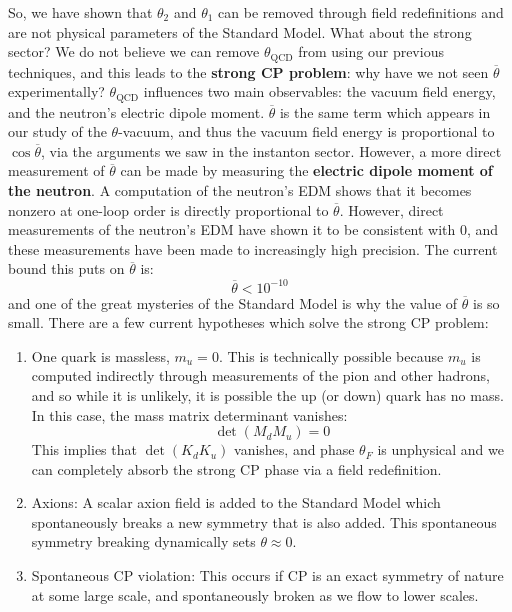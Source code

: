 \documentclass[11pt, oneside]{article}   	%
\theoremstyle{definition}
\begin{document}
So, we have shown that $\theta_2$ and $\theta_1$ can be removed through field redefinitions and are not physical parameters of the Standard Model. 
What about the strong sector? We do not believe we can remove $\theta_\mathrm{QCD}$ from using our previous techniques, and this leads 
to the \textbf{strong CP problem}: why have we not seen $\overline\theta$ experimentally? $\theta_\mathrm{QCD}$ influences two main 
observables: the vacuum field energy, and the neutron's electric dipole moment. $\overline\theta$ is the same term which appears in our study of the 
$\theta$-vacuum, and thus the vacuum field energy is proportional to $\cos\overline\theta$, via the arguments we saw in the instanton sector. 
However, a more direct measurement of $\overline\theta$ can be made by measuring the \textbf{electric dipole moment of the neutron}. 
A computation of the neutron's EDM shows that it becomes nonzero at one-loop order is directly proportional to $\overline\theta$. However, 
direct measurements of the neutron's EDM have shown it to be consistent with 0, and these measurements have been made to increasingly high 
precision. The current bound this puts on $\overline\theta$ is:
\begin{equation}
	\overline\theta < 10^{-10}
\end{equation}
and one of the great mysteries of the Standard Model is why the value of $\overline\theta$ is so small. There are a few current hypotheses which solve 
the strong CP problem:
\begin{enumerate}
	\item One quark is massless, $m_u = 0$. This is technically possible because $m_u$ is computed indirectly through measurements of the pion and 
	other hadrons, and so while it is unlikely, it is possible the up (or down) quark has no mass. In this case, the mass matrix determinant vanishes:
	\begin{equation}
		\det(M_d M_u) = 0
	\end{equation}
	This implies that $\det(K_d K_u)$ vanishes, and phase $\theta_F$ is unphysical and we can completely absorb the strong CP phase via a field 
	redefinition. 
	\item Axions: A scalar axion field is added to the Standard Model which spontaneously breaks a new symmetry that is also added. This spontaneous 
	symmetry breaking dynamically sets $\theta\approx 0$. 
	\item Spontaneous CP violation: This occurs if CP is an exact symmetry of nature at some large scale, and spontaneously broken as we flow to 
	lower scales. 
\end{enumerate}
\end{document}
